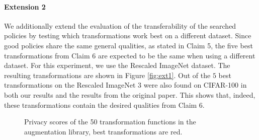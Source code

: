 \paragraph{Extension 2} We additionally extend the evaluation of the transferability of the searched policies by testing which transformations work best on a different dataset. Since good policies share the same general qualities, as stated in Claim 5, the five best transformations from Claim 6 are expected to be the same when using a different dataset. For this experiment, we use the Rescaled ImageNet dataset. The resulting transformations are shown in Figure \ref{fig:ext1}. Out of the $5$ best transformations on the Rescaled ImageNet $3$ were also found on CIFAR-100 in both our results and the results from the original paper. This shows that, indeed, these transformations contain the desired qualities from Claim 6.

\begin{figure}[H]
    \centering
    \hspace{5mm}
    \caption{Privacy scores of the 50 transformation functions in the augmentation library, best transformations are red.}
    \label{fig:5}
\end{figure}

